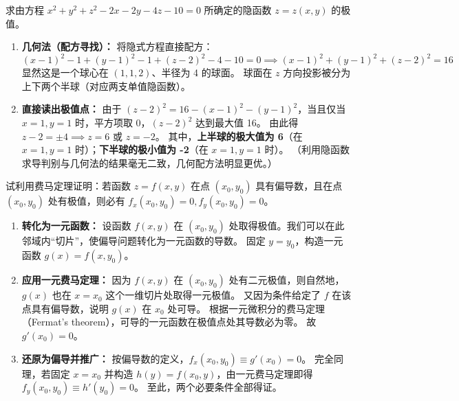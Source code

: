 \documentclass[lang=cn,11pt]{elegantbook}
\begin{document}
\begin{exercise}[二阶曲面的隐函数极值二]
求由方程 $x^2+y^2+z^2-2x-2y-4z-10=0$ 所确定的隐函数 $z=z(x,y)$ 的极值。
\end{exercise}
\begin{solution}
\begin{enumerate}
  \item \textbf{几何法（配方寻找）：}
  将隐式方程直接配方：
  \[ (x-1)^2 - 1 + (y-1)^2 - 1 + (z-2)^2 - 4 - 10 = 0 \implies (x-1)^2 + (y-1)^2 + (z-2)^2 = 16 \]
  显然这是一个球心在 $(1,1,2)$、半径为 4 的球面。
  球面在 $z$ 方向投影被分为上下两个半球（对应两支单值隐函数）。

  \item \textbf{直接读出极值点：}
  由于 $(z-2)^2 = 16 - (x-1)^2 - (y-1)^2$，当且仅当 $x=1, y=1$ 时，平方项取 0，$(z-2)^2$ 达到最大值 16。
  由此得 $z-2 = \pm 4 \implies z=6$ 或 $z=-2$。
  其中，\textbf{上半球的极大值为 6}（在 $x=1, y=1$ 时）；\textbf{下半球的极小值为 -2}（在 $x=1, y=1$ 时）。
  （利用隐函数求导判别与几何法的结果毫无二致，几何配方法明显更优。）
\end{enumerate}
\end{solution}

\begin{exercise}
试利用费马定理证明：若函数 $z=f(x,y)$ 在点 $(x_0,y_0)$ 具有偏导数，且在点 $(x_0,y_0)$ 处有极值，则必有 $f_x(x_0,y_0)=0,f_y(x_0,y_0)=0$。
\end{exercise}
\begin{solution}
\begin{enumerate}
  \item \textbf{转化为一元函数：}
  设函数 $f(x,y)$ 在 $(x_0,y_0)$ 处取得极值。我们可以在此邻域内“切片”，使偏导问题转化为一元函数的导数。
  固定 $y = y_0$，构造一元函数 $g(x) = f(x, y_0)$。

  \item \textbf{应用一元费马定理：}
  因为 $f(x,y)$ 在 $(x_0,y_0)$ 处有二元极值，则自然地，$g(x)$ 也在 $x = x_0$ 这个一维切片处取得一元极值。
  又因为条件给定了 $f$ 在该点具有偏导数，说明 $g(x)$ 在 $x_0$ 处可导。
  根据一元微积分的费马定理（Fermat's theorem），可导的一元函数在极值点处其导数必为零。
  故 $g'(x_0) = 0$。

  \item \textbf{还原为偏导并推广：}
  按偏导数的定义，$f_x(x_0,y_0) \equiv g'(x_0) = 0$。
  完全同理，若固定 $x = x_0$ 并构造 $h(y) = f(x_0, y)$，由一元费马定理即得 $f_y(x_0,y_0) \equiv h'(y_0) = 0$。
  至此，两个必要条件全部得证。
\end{enumerate}
\end{solution}
\end{document}
